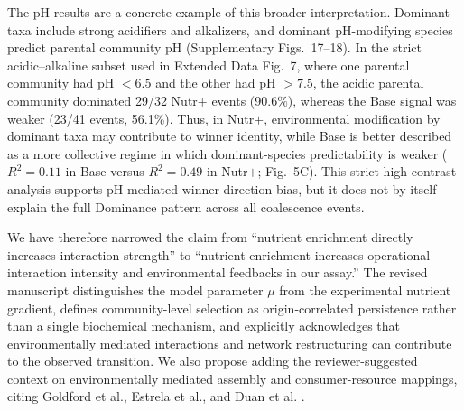 The pH results are a concrete example of this broader interpretation. Dominant taxa include strong acidifiers and alkalizers, and dominant pH-modifying species predict parental community pH (Supplementary Figs.~17--18). In the strict acidic--alkaline subset used in Extended Data Fig.~7, where one parental community had pH $<6.5$ and the other had pH $>7.5$, the acidic parental community dominated 29/32 Nutr$+$ events (90.6\%), whereas the Base signal was weaker (23/41 events, 56.1\%). Thus, in Nutr$+$, environmental modification by dominant taxa may contribute to winner identity, while Base is better described as a more collective regime in which dominant-species predictability is weaker ($R^2 = 0.11$ in Base versus $R^2 = 0.49$ in Nutr$+$; Fig.~5C). This strict high-contrast analysis supports pH-mediated winner-direction bias, but it does not by itself explain the full Dominance pattern across all coalescence events.

We have therefore narrowed the claim from ``nutrient enrichment directly increases interaction strength'' to ``nutrient enrichment increases operational interaction intensity and environmental feedbacks in our assay.'' The revised manuscript distinguishes the model parameter $\mu$ from the experimental nutrient gradient, defines community-level selection as origin-correlated persistence rather than a single biochemical mechanism, and explicitly acknowledges that environmentally mediated interactions and network restructuring can contribute to the observed transition. We also propose adding the reviewer-suggested context on environmentally mediated assembly and consumer-resource mappings, citing Goldford et al., Estrela et al., and Duan et al. \citep{Goldford2018,Estrela2021,DuanPawar2025}.

